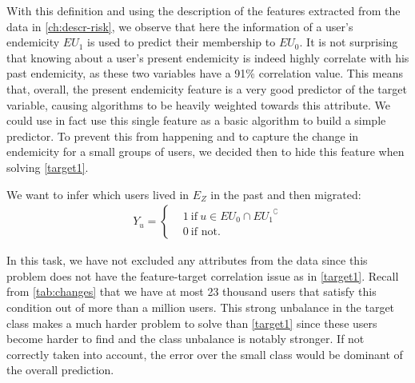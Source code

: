 With this definition and using the description of the features extracted from the data in \cref{ch:descr-risk}, we observe that here the information of a user's endemicity $EU_{1}$ is used to predict their membership to $EU_{0}$.
It is not surprising that knowing about a user's present endemicity is indeed highly correlate with his past endemicity, as these two variables have a 91\% correlation value.
This means that, overall, the present endemicity feature is a very good predictor of the target variable, causing algorithms to be heavily weighted towards this attribute.
We could use in fact use this single feature as a basic algorithm to build a simple predictor.
To prevent this from happening and to capture the change in endemicity for a small groups of users, we decided then to hide this feature when solving \cref{target1}.



\begin{problem}\label{target2}
We want to infer which users lived in $E_Z$ in the past and then migrated:
	\begin{align*}
				Y_u =
				\begin{cases}
					&1 \ \mbox{if} \ u \in EU_{0} \cap { EU_{1} }^{\complement}  \\
					&0 \ \mbox{if not}.
				\end{cases}
			\end{align*}
\end{problem}

In this task, we have not excluded any attributes from the data since this problem does not have the feature-target correlation issue as in \cref{target1}.
Recall from \cref{tab:changes} that we have at most 23 thousand users that satisfy this condition out of more than a million users.
This strong unbalance in the target class makes a much harder problem to solve than \cref{target1} since these users become harder to find and the class unbalance is notably stronger.
If not correctly taken into account, the error over the small class would be dominant of the overall prediction.

